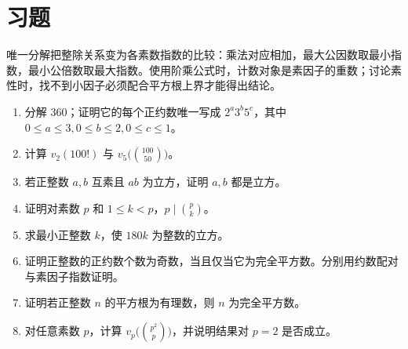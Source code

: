 \section{习题}

唯一分解把整除关系变为各素数指数的比较：乘法对应相加，最大公因数取最小指数，最小公倍数取最大指数。使用阶乘公式时，计数对象是素因子的重数；讨论素性时，找不到小因子必须配合平方根上界才能得出结论。

\begin{enumerate}
 \item 分解 $360$；证明它的每个正约数唯一写成 $2^a3^b5^c$，其中 $0\le a\le3,0\le b\le2,0\le c\le1$。
 \item 计算 $v_2(100!)$ 与 $v_5\bigl(\binom{100}{50}\bigr)$。
 \item 若正整数 $a,b$ 互素且 $ab$ 为立方，证明 $a,b$ 都是立方。
 \item 证明对素数 $p$ 和 $1\le k<p$，$p\mid\binom pk$。
 \item\label{ex:prime-cube} 求最小正整数 $k$，使 $180k$ 为整数的立方。
 \item\label{ex:prime-odd-divisors} 证明正整数的正约数个数为奇数，当且仅当它为完全平方数。分别用约数配对与素因子指数证明。
 \item\label{ex:prime-rational-root} 证明若正整数 $n$ 的平方根为有理数，则 $n$ 为完全平方数。
 \item\label{ex:prime-binomial} 对任意素数 $p$，计算 $v_p\bigl(\binom{p^2}{p}\bigr)$，并说明结果对 $p=2$ 是否成立。
\end{enumerate}

